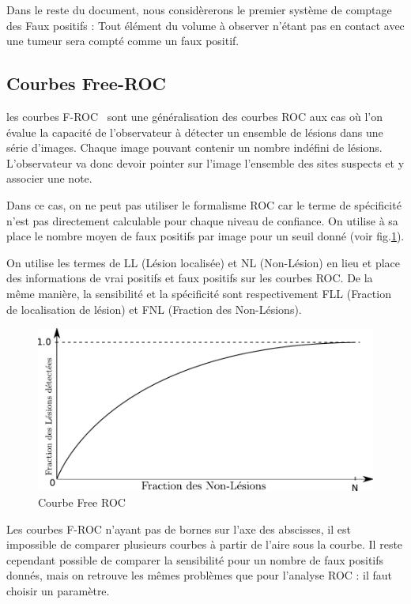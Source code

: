Dans le reste du document, nous considèrerons le premier système de comptage des Faux positifs : Tout élément du volume à observer n'étant pas en contact avec une tumeur sera compté comme un faux positif.


\subsection{Courbes Free-ROC}
\label{lab:FROC}

les courbes F-ROC~\cite{bunch1978free} sont une généralisation des courbes ROC aux cas où l'on évalue la capacité de l'observateur à détecter un ensemble de lésions dans une série d'images. Chaque image pouvant contenir un nombre indéfini de lésions. L'observateur va donc devoir pointer sur l'image l'ensemble des sites suspects et y associer une note.

Dans ce cas, on ne peut pas utiliser le formalisme ROC car le terme de spécificité n'est pas directement calculable pour chaque niveau de confiance. On utilise à sa place le nombre moyen de faux positifs par image pour un seuil donné (voir fig.\ref{fig:courbeFROC}).

On utilise les termes de LL (Lésion localisée) et NL (Non-Lésion) en lieu et place des informations de vrai positifs et faux positifs sur les courbes ROC. De la même manière, la sensibilité et la spécificité sont respectivement FLL (Fraction de localisation de lésion) et FNL (Fraction des Non-Lésions).

\begin{figure}[h]
	\label{fig:courbeFROC}
	\begin{center}
	\includegraphics[width=15cm]{images/FROC}
	\end{center}
	\caption{Courbe Free ROC}
\end{figure}

Les courbes F-ROC n'ayant pas de bornes sur l’axe des abscisses, il est impossible de comparer plusieurs courbes à partir de l'aire sous la courbe. Il reste cependant possible de comparer la sensibilité pour un nombre de faux positifs donnés, mais on retrouve les mêmes problèmes que pour l'analyse ROC : il faut choisir un paramètre.

